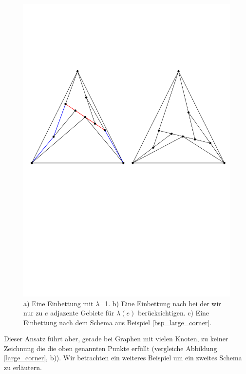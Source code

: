\begin{figure}[h]
	\centering
  \includegraphics[width=1\textwidth]{example1_vis.pdf}
  \caption{a) Eine Einbettung mit $\lambda$=1. b) Eine Einbettung nach bei der wir nur zu $e$ adjazente Gebiete für $\lambda(e)$ berücksichtigen. c) Eine Einbettung nach dem Schema aus Beispiel \ref{bsp_large_corner}.}
  \label{long_segment}
\end{figure}

Dieser Ansatz führt aber, gerade bei Graphen mit vielen Knoten, zu keiner Zeichnung die die oben genannten Punkte erfüllt (vergleiche Abbildung \ref{large_corner}, b)). Wir betrachten ein weiteres Beispiel um ein zweites Schema zu erläutern.


